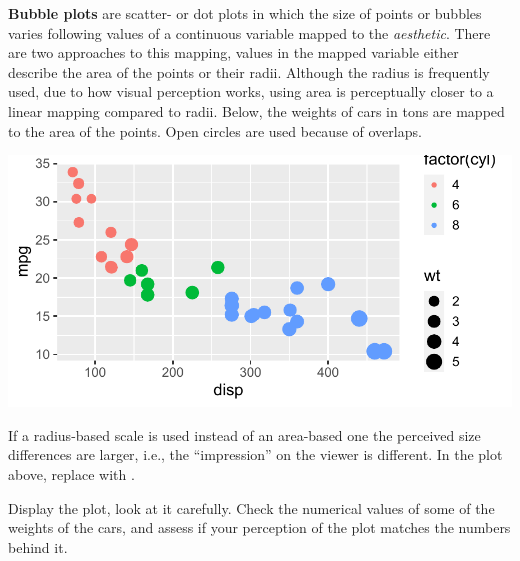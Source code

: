 \documentclass[krantz2]{krantz}\usepackage{knitr}
\begin{document}
\textbf{Bubble plots} are scatter- or dot plots in which the size of points or bubbles varies following values of a continuous variable mapped to the  \emph{aesthetic}. There are two approaches to this mapping, values in the mapped variable either describe the area of the points or their radii. Although the radius is frequently used, due to how visual perception works, using area is perceptually closer to a linear mapping compared to radii. Below, the weights of cars in tons are mapped to the area of the points. Open circles are used because of overlaps.

\begin{knitrout}\footnotesize
{}\color{fgcolor}\begin{kframe}
\begin{alltt}
\hlstd{(} 
        \hlstd{=} \hlstd{(}     \hlstd{=}    \hlopt{+}
  \hlstd{()} \hlopt{+}
  \hlstd{(} \hlstd{=} \hlstd{,}  \hlstd{=} \hlstd{)}
\end{alltt}
\end{kframe}

{\centering \includegraphics[width=.7\textwidth]{figure/pos-scatter-16-1} 

}


\end{knitrout}

\begin{playground}
If a radius-based scale is used instead of an area-based one the perceived size differences are larger, i.e., the ``impression'' on the viewer is different. In the plot above, replace  with .

Display the plot, look at it carefully. Check the numerical values of some of the weights of the cars, and assess if your perception of the plot matches the numbers behind it.
\end{playground}
\end{document}
